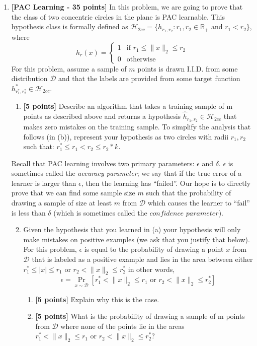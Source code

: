 \begin{enumerate}
\item \textbf{[PAC Learning - 35 points]}
  In this problem, we are going to prove that the class of 
  two concentric circles in the plane is PAC learnable. 
  This hypothesis class is formally defined as 
  $\mathcal{H}_{2cc} = \{h_{r_1,r_2}: 
    r_1, r_2 \in \mathbb{R}_+ \text{ and } r_1<r_2\}$, where 
  \[ h_r(x) = \begin{cases}1 & \text{if } r_1 \leq \|x\|_2 \leq r_2 \\
                0 & \text{otherwise}
  			\end{cases}  
  \]
For this problem, assume a sample of $m$ points is drawn I.I.D. 
from some distribution $\mathcal{D}$ and that the labels are 
provided from some target function $h^*_{r_1^*,r_2^*} \in \mathcal{H}_{2cc}$.

\begin{enumerate}
\item \textbf{[5 points]} Describe an algorithm that takes a training sample of m 
points as described above and returns a hypothesis 
$\hat{h}_{r_1,r_2} \in \mathcal{H}_{2cc}$ 
that makes zero mistakes on the training sample. 
To simplify the analysis that follows (in (b)), represent your 
hypothesis as two circles with radii $r_1, r_2$ such that:
$r_1^* \leq r_1 < r_2 \leq r_2*k$.

\end{enumerate}

Recall that PAC learning involves two primary parameters: 
$\epsilon$ and $\delta$. $\epsilon$ is sometimes called 
the \textit{accuracy parameter}; we say that if the true 
error of a learner is larger than $\epsilon$, then the 
learning has ``failed''. Our hope is to directly prove that we can 
find some sample size $m$ such that the probability of 
drawing a sample of size at least $m$ from $\mathcal{D}$ 
which causes the learner to ``fail'' is less than $\delta$ 
(which is sometimes called the $\textit{confidence parameter}$).

\begin{enumerate}
\setcounter{enumii}{1}
\item 
Given the hypothesis that you learned in (a) your hypothesis will only make 
mistakes on positive examples (we ask that you justify that below).
For this problem, $\epsilon$ is equal to the probability 
of drawing a point $x$ from $\mathcal{D}$ 
that is labeled as a positive example and lies in the area between 
either  $r_1^* \leq |x| \leq r_1$ or $r_2 < \|x\|_2 \leq r_2^*$ 
in other words,
\[ \epsilon = 
\Pr_{x \sim \mathcal{D}}[r_1^* < \|x\|_2 \leq r_1
                          \text{ or } r_2 < \|x\|_2 \leq r_2^*]
\]
\begin{enumerate} 
	\item \textbf{[5 points]} Explain why this is the case.
	\item \textbf{[5 points]} What is the probability of drawing 
          a sample of m points from $\mathcal{D}$ where none of the 
          points lie in the areas 
           $  r_1^* < \|x\|_2 \leq r_1 
                          \text{ or } r_2 < \|x\|_2 \leq r_2^*$?
\end{enumerate}


\end{enumerate}
\end{enumerate}
